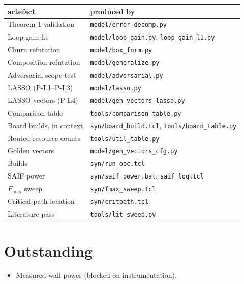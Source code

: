 \documentclass[11pt,a4paper]{article}
\begin{document}
\begin{center}\small
\begin{tabular}{ll}
\toprule
artefact & produced by \\
\midrule
Theorem 1 validation      & \texttt{model/error\_decomp.py} \\
Loop-gain fit             & \texttt{model/loop\_gain.py}, \texttt{loop\_gain\_l1.py} \\
Churn refutation          & \texttt{model/box\_form.py} \\
Composition refutation    & \texttt{model/generalize.py} \\
Adversarial scope test    & \texttt{model/adversarial.py} \\
LASSO (P-L1--P-L3)        & \texttt{model/lasso.py} \\
LASSO vectors (P-L4)      & \texttt{model/gen\_vectors\_lasso.py} \\
Comparison table          & \texttt{tools/comparison\_table.py} \\
Board builds, in context  & \texttt{syn/board\_build.tcl}, \texttt{tools/board\_table.py} \\
Routed resource counts    & \texttt{tools/util\_table.py} \\
Golden vectors            & \texttt{model/gen\_vectors\_cfg.py} \\
Builds                    & \texttt{syn/run\_ooc.tcl} \\
SAIF power                & \texttt{syn/saif\_power.bat}, \texttt{saif\_log.tcl} \\
$F_{\max}$ sweep          & \texttt{syn/fmax\_sweep.tcl} \\
Critical-path location    & \texttt{syn/critpath.tcl} \\
Literature pass           & \texttt{tools/lit\_sweep.py} \\
\bottomrule
\end{tabular}
\end{center}

\section{Outstanding}

\begin{itemize}
\item Measured wall power (blocked on instrumentation).
\end{itemize}
\end{document}
